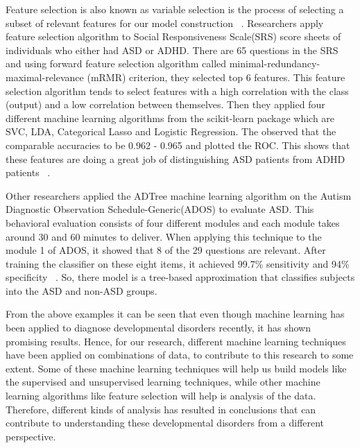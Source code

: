 Feature selection is also known as variable selection is the process of selecting a subset of relevant features for our model construction ~\cite{james2013introduction}. Researchers apply feature selection algorithm to Social Responsiveness Scale(SRS) score sheets of individuals who either had ASD or ADHD. There are 65 questions in the SRS and using forward feature selection algorithm called minimal-redundancy-maximal-relevance (mRMR) criterion, they selected top 6 features. This feature selection algorithm tends to select features with a high correlation with the class (output) and a low correlation between themselves. Then they applied four different machine learning algorithms from the scikit-learn package which are SVC, LDA, Categorical Lasso and Logistic Regression. The observed that the comparable accuracies to be 0.962 - 0.965 and plotted the ROC. This shows that these features are doing a great job of distinguishing ASD patients from ADHD patients ~\cite{duda2017use}. 

Other researchers applied the ADTree machine learning algorithm on the Autism Diagnostic Observation Schedule-Generic(ADOS) to evaluate ASD. This behavioral evaluation consists of four different modules and each module takes around 30 and 60 minutes to deliver. When applying this technique to the module 1 of ADOS, it showed that 8 of the 29 questions are relevant. After training the classifier on these eight items, it achieved 99.7\% sensitivity and 94\% specificity ~\cite{wall2012use}. So, there model is a tree-based approximation that classifies subjects into the ASD and non-ASD groups.

From the above examples it can be seen that even though machine learning has been applied to diagnose developmental disorders recently, it has shown promising results. Hence, for our research, different machine learning techniques have been applied on combinations of data, to contribute to this research to some extent. Some of these machine learning techniques will help us build models like the supervised and unsupervised learning techniques, while other machine learning algorithms like feature selection will help is analysis of the data. Therefore, different kinds of analysis has resulted in conclusions that can contribute to understanding these developmental disorders from a different perspective.
